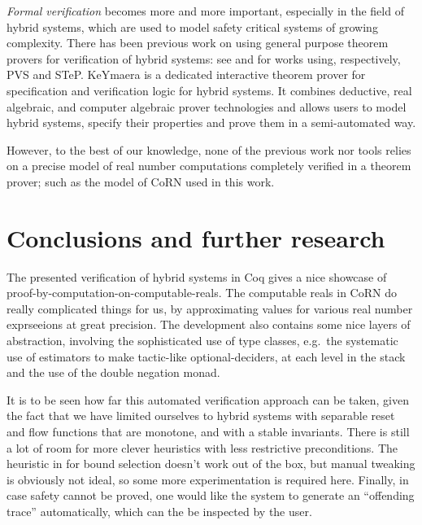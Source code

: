 \documentclass[runningheads]{llncs}
\begin{document}
\emph{Formal verification} becomes more and more important, especially in the
field of hybrid systems, which are used to model safety critical systems 
of growing complexity. There has been previous work on using general purpose 
theorem provers for verification of hybrid systems: see \cite{Mum01,Hen98} 
and \cite{Man98,Man01} for works using, respectively, PVS and STeP. 
KeYmaera \cite{KeYmaera} is a dedicated interactive theorem prover for 
specification and verification logic for hybrid systems. It combines
deductive, real algebraic, and computer algebraic prover technologies
and allows users to model hybrid systems, specify their properties
and prove them in a semi-automated way.

However, to the best of our knowledge, none of the previous work nor tools 
relies on a precise model of real number computations completely verified 
in a theorem prover; such as the model of CoRN used in this work.

\section{Conclusions and further research}
The presented verification of hybrid systems in Coq gives a nice
showcase of proof-by-computation-on-computable-reals. The computable
reals in CoRN do really complicated things for us, by approximating
values for various real number exprseeions at great precision. The
development also contains some nice layers of abstraction, involving
the sophisticated use of type classes, e.g.\ the systematic use of
estimators to make tactic-like optional-deciders, at each level in the
stack and the use of the double negation monad.

It is to be seen how far this automated verification approach can be
taken, given the fact that we have limited ourselves to hybrid systems
with separable reset and flow functions that are monotone, and with a
stable invariants. There is still a lot of room for more clever
heuristics with less restrictive preconditions. The heuristic in
\cite{alur} for bound selection doesn't work out of the box, but
manual tweaking is obviously not ideal, so some more experimentation
is required here. Finally, in case safety cannot be proved, one would
like the system to generate an ``offending trace'' automatically,
which can the be inspected by the user.

%


\end{document}
